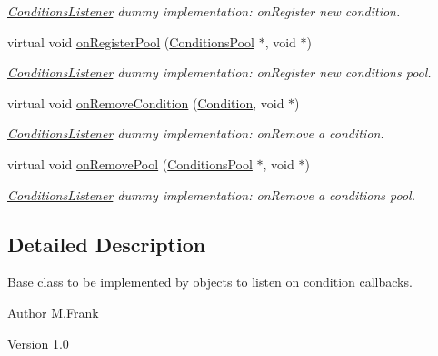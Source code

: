 \begin{DoxyCompactItemize}
\begin{DoxyCompactList}\small\item\em \hyperlink{class_d_d4hep_1_1_conditions_1_1_conditions_listener}{ConditionsListener} dummy implementation: onRegister new condition. \item\end{DoxyCompactList}\item 
virtual void \hyperlink{class_d_d4hep_1_1_conditions_1_1_conditions_listener_a161a768eb8f00b3272d85f95ec14fa86}{onRegisterPool} (\hyperlink{class_d_d4hep_1_1_conditions_1_1_conditions_pool}{ConditionsPool} $\ast$, void $\ast$)
\begin{DoxyCompactList}\small\item\em \hyperlink{class_d_d4hep_1_1_conditions_1_1_conditions_listener}{ConditionsListener} dummy implementation: onRegister new conditions pool. \item\end{DoxyCompactList}\item 
virtual void \hyperlink{class_d_d4hep_1_1_conditions_1_1_conditions_listener_ab0c021c6ef8e6c47f28dd077220ee1f3}{onRemoveCondition} (\hyperlink{class_d_d4hep_1_1_conditions_1_1_condition}{Condition}, void $\ast$)
\begin{DoxyCompactList}\small\item\em \hyperlink{class_d_d4hep_1_1_conditions_1_1_conditions_listener}{ConditionsListener} dummy implementation: onRemove a condition. \item\end{DoxyCompactList}\item 
virtual void \hyperlink{class_d_d4hep_1_1_conditions_1_1_conditions_listener_aadd6949fa8606ac66cab08494ab79412}{onRemovePool} (\hyperlink{class_d_d4hep_1_1_conditions_1_1_conditions_pool}{ConditionsPool} $\ast$, void $\ast$)
\begin{DoxyCompactList}\small\item\em \hyperlink{class_d_d4hep_1_1_conditions_1_1_conditions_listener}{ConditionsListener} dummy implementation: onRemove a conditions pool. \item\end{DoxyCompactList}\end{DoxyCompactItemize}


\subsection{Detailed Description}
Base class to be implemented by objects to listen on condition callbacks. \begin{DoxyAuthor}{Author}
M.Frank 
\end{DoxyAuthor}
\begin{DoxyVersion}{Version}
1.0 
\end{DoxyVersion}


